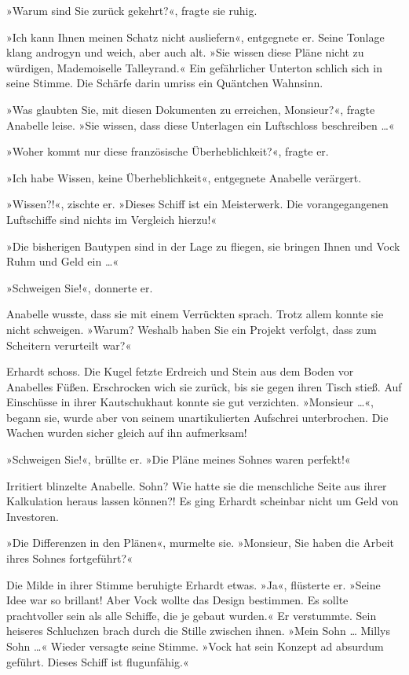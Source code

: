 »Warum sind Sie zurück gekehrt?«, fragte sie ruhig.

»Ich kann Ihnen meinen Schatz nicht ausliefern«, entgegnete er.
Seine Tonlage klang androgyn und weich, aber auch alt. »Sie wissen
diese Pläne nicht zu würdigen, Mademoiselle Talleyrand.« Ein
gefährlicher Unterton schlich sich in seine Stimme. Die Schärfe
darin umriss ein Quäntchen Wahnsinn.

»Was glaubten Sie, mit diesen Dokumenten zu erreichen, Monsieur?«,
fragte Anabelle leise. »Sie wissen, dass diese Unterlagen ein
Luftschloss beschreiben …«

»Woher kommt nur diese französische Überheblichkeit?«, fragte er.

»Ich habe Wissen, keine Überheblichkeit«, entgegnete Anabelle
verärgert.

»Wissen?!«, zischte er. »Dieses Schiff ist ein Meisterwerk. Die
vorangegangenen Luftschiffe sind nichts im Vergleich hierzu!«

»Die bisherigen Bautypen sind in der Lage zu fliegen, sie bringen
Ihnen und Vock Ruhm und Geld ein …«

»Schweigen Sie!«, donnerte er.

Anabelle wusste, dass sie mit einem Verrückten sprach. Trotz allem
konnte sie nicht schweigen. »Warum? Weshalb haben Sie ein Projekt
verfolgt, dass zum Scheitern verurteilt war?«

Erhardt schoss. Die Kugel fetzte Erdreich und Stein aus dem Boden
vor Anabelles Füßen. Erschrocken wich sie zurück, bis sie gegen
ihren Tisch stieß. Auf Einschüsse in ihrer Kautschukhaut konnte sie
gut verzichten. »Monsieur …«, begann sie, wurde aber von seinem
unartikulierten Aufschrei unterbrochen. Die Wachen wurden sicher
gleich auf ihn aufmerksam!

»Schweigen Sie!«, brüllte er. »Die Pläne meines Sohnes waren
perfekt!«

Irritiert blinzelte Anabelle. Sohn? Wie hatte sie die menschliche
Seite aus ihrer Kalkulation heraus lassen können?! Es ging Erhardt
scheinbar nicht um Geld von Investoren.

»Die Differenzen in den Plänen«, murmelte sie. »Monsieur, Sie haben
die Arbeit ihres Sohnes fortgeführt?«

Die Milde in ihrer Stimme beruhigte Erhardt etwas. »Ja«, flüsterte
er. »Seine Idee war so brillant! Aber Vock wollte das Design
bestimmen. Es sollte prachtvoller sein als alle Schiffe, die je
gebaut wurden.« Er verstummte. Sein heiseres Schluchzen brach durch
die Stille zwischen ihnen. »Mein Sohn … Millys Sohn …« Wieder
versagte seine Stimme. »Vock hat sein Konzept ad absurdum geführt.
Dieses Schiff ist flugunfähig.«

